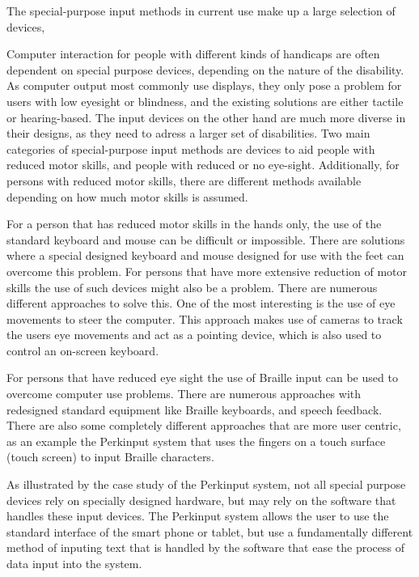 
The special-purpose input methods in current use make up a large selection of devices, 

Computer interaction for people with different kinds of handicaps are often dependent on special purpose devices, depending on the nature of the disability. As computer output most commonly use displays, they only pose a problem for users with low eyesight or blindness, and the existing solutions are either tactile or hearing-based. The input devices on the other hand are much more diverse in their designs, as they need to adress a larger set of disabilities. Two main categories of special-purpose input methods are devices to aid people with reduced motor skills, and people with reduced or no eye-sight. Additionally, for persons with reduced motor skills, there are different methods available depending on how much motor skills is assumed.


For a person that has reduced motor skills in the hands only, the use of the standard keyboard and mouse can be difficult or impossible. There are solutions where a special designed keyboard and mouse designed for use with the feet can overcome this problem.
For persons that have more extensive reduction of motor skills the use of such devices might also be a problem. There are numerous different approaches to solve this. One of the most interesting is the use of eye movements to steer the computer. This approach makes use of cameras to track the users eye movements and act as a pointing device, which is also used to control an on-screen keyboard. 

For persons that have reduced eye sight the use of Braille input can be used to overcome computer use problems. There are numerous approaches with redesigned standard equipment like Braille keyboards, and speech feedback. There are also some completely different approaches that are more user centric, as an example the Perkinput system that uses the fingers on a touch surface (touch screen) to input Braille characters.

As illustrated by the case study of the Perkinput system, not all special purpose devices rely on specially designed hardware, but may rely on the software that handles these input devices. The Perkinput system allows the user to use the standard interface of the smart phone or tablet, but use a fundamentally different method of inputing text that is handled by the software that ease the process of data input into the system.

